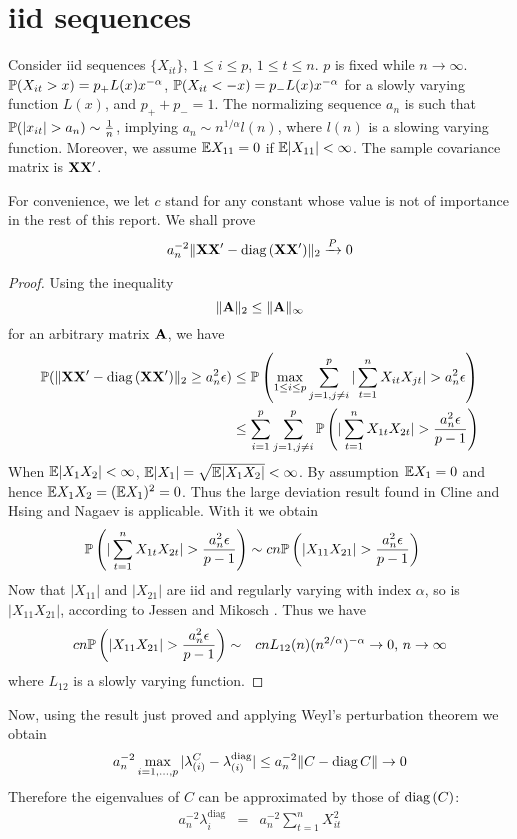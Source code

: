 \documentclass{article}
\begin{document}
\section{iid sequences}\label{sec:iid}
Consider iid sequences $\{X_{it}\}$, $1 \leq i \leq p$, $1 \leq t \leq
n$. $p$ is fixed while $n \to \infty$. $\mathbb{P}(X_{it} > x) = p_+ L(x)
x^{-\alpha}$, $\mathbb{P}(X_{it} < -x) = p_- L(x) x^{-\alpha}$ for a slowly
varying function $L(x)$, and $p_+ + p_- = 1$. The normalizing sequence
$a_n$ is such that $\mathbb{P}(|x_{it}| > a_n) \sim {1 \over n}$, implying
$a_n \sim n^{1/\alpha} l(n)$, where $l(n)$ is a slowing varying
function. Moreover, we assume $\mathbb{E} X_{11} = 0$ if $\mathbb{E} |X_{11}| <
\infty$. The sample covariance matrix is $\mathbf{XX'}$.

For convenience, we let $c$ stand for any constant whose value is not
of importance in the rest of this report. We shall prove
\[
a_n^{-2}\|\mathbf{XX'} - \text{diag\,}(\mathbf{XX'})\|_2 \xrightarrow{P} 0
\]

\begin{proof}
  Using the inequality
  \[
  \|\mathbf{A}\|_2 \leq \|\mathbf{A}\|_\infty
  \]
  for an arbitrary matrix $\mathbf{A}$, we have
  \begin{align*}
    \mathbb{P}(\|\mathbf{XX'} - \text{diag\,}(\mathbf{XX'})\|_2 \geq a_n^2 \epsilon) & \leq
    \mathbb{P}\left(\max_{1\leq i \leq p} \sum_{j=1, j\neq i}^p |\sum_{t=1}^n
    X_{it} X_{jt}| > a_n^2 \epsilon\right) \\
    &\leq \sum_{i=1}^p \sum_{j=1, j\neq i}^p \mathbb{P}\left(|\sum_{t=1}^n
    X_{1t} X_{2t}| > {a_n^2 \epsilon \over p-1}\right) \\
  \end{align*}
  When $\mathbb{E}|X_1 X_2| < \infty$, $\mathbb{E}|X_1| =\sqrt{\mathbb{E}|X_1 X_2|} < \infty$.
  By assumption $\mathbb{E} X_1 = 0$ and hence $\mathbb{E} X_1 X_2 = (\mathbb{E} X_1)^2 = 0$.
  Thus the large deviation result found in Cline and Hsing
  \cite{ClingHsing1998} and Nagaev \cite{nagaev1979} is
  applicable. With it we obtain
  \begin{align*}
    \mathbb{P}\left(|\sum_{t=1}^n X_{1t} X_{2t}| > {a_n^2 \epsilon \over p-1}\right)
    &\sim
    c n \mathbb{P}\left(|X_{11} X_{21}| > {a_n^2 \epsilon \over p-1 }\right)
  \end{align*}
  Now that $|X_{11}|$ and $|X_{21}|$ are iid and regularly varying
  with index $\alpha$, so is $|X_{11} X_{21}|$, according to Jessen
  and Mikosch \cite{JessenMikosch2006}. Thus we have
  \begin{eqnarray*}
    c n \mathbb{P}\left(|X_{11} X_{21}| > {a_n^2 \epsilon \over p-1 }\right)
    &\sim& c n L_{12}(n) (n^{2/\alpha})^{-\alpha} \to 0\text{,  }n\to\infty
  \end{eqnarray*}
  where $L_{12}$ is a slowly varying function.
\end{proof}
Now, using the result just proved and applying Weyl's perturbation
theorem we obtain
\[
a_n^{-2} \max_{i=1,\dots,p} |\lambda^C_{(i)} -
\lambda^{\text{diag}}_{(i)}| \leq  a_n^{-2}\|C - \text{diag\,}{C}\| \to 0
\]
Therefore the eigenvalues of $C$ can be approximated by those of
$\text{diag\,}(C)$:
\begin{eqnarray*}
a_n^{-2}\lambda^{\text{diag}}_{i}  &=& a_n^{-2} \sum_{t=1}^n X_{it}^2
\end{eqnarray*}
\end{document}
